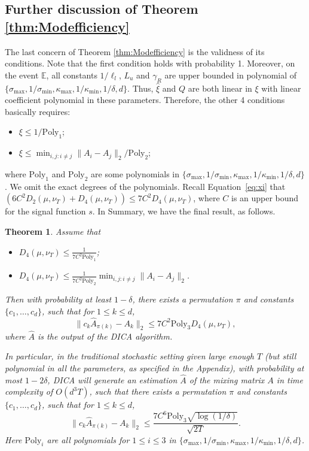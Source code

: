 \documentclass[twoside]{article}
\newcommand{\E}{\mathbb{E}}
\newtheorem{thm}[lemma]{Theorem}
\theoremstyle{definition}
\begin{document}
\subsection{Further discussion of Theorem \ref{thm:Modefficiency}}
 \label{subsec:ThminStocSetting}
The last concern of Theorem \ref{thm:Modefficiency} is the validness of its conditions. 
Note that the first condition holds with probability 1. 
Moreover, on the event $\E$, all constants $1/\ell_l$, $L_u$ and $\gamma_R$ are upper bounded in polynomial of $\{\sigma_{\max}, 1/\sigma_{\min}, \kappa_{\max}, 1/\kappa_{\min},1/\delta, d\}$. 
Thus, $\widehat{\xi}$  and $Q$ are both linear in $\xi$ with linear coefficient polynomial in these parameters.
Therefore, the other 4 conditions basically requires:
\begin{itemize}
\vspace{-3mm}
\item $\xi \le 1/ \text{Poly}_1$;
\item $\xi \le \min_{i,j:i\neq j} \|A_i - A_j\|_2 / \text{Poly}_2$;
\end{itemize} 
\vspace{-2mm}
where $\text{Poly}_1$ and $\text{Poly}_2$ are some polynomials in $\{\sigma_{\max}, 1/\sigma_{\min}, \kappa_{\max}, 1/\kappa_{\min},1/\delta, d\}$. 
We omit the exact degrees of the polynomials.
Recall Equation~\eqref{eq:xi} that $\left( 6C^2D_2(\mu, \nu_T) + D_4(\mu, \nu_T)\right) \le 7C^2D_4(\mu, \nu_T)$, where $C$ is an upper bound for the signal function $s$.
In Summary, we have the final result, as follows.
\begin{thm}
\label{thm:finalRes}
 Assume that 
\begin{itemize}
\vspace{-3mm}
\item $D_4(\mu, \nu_T) \le \frac{1}{7C^2\text{Poly}_1}$;
\item $D_4(\mu, \nu_T) \le \frac{1}{7C^2\text{Poly}_2}\min_{i,j:i\neq j} \|A_i - A_j\|_2$.
\end{itemize}
\vspace{-2mm}
Then with probability at least $1-\delta$, there exists a permutation $\pi$ and constants $\{c_1,\ldots,c_d\}$, such that for $1\le k\le d$,
\[
\| c_k\widehat{A}_{\pi(k)} - A_k\|_2 \le 7C^2\text{Poly}_3D_4(\mu, \nu_T),
\]
where $\widehat{A}$ is the output of the DICA algorithm.

In particular, in the traditional stochastic setting given large enough $T$ (but still polynomial in all the parameters, as specified in the Appendix),
 with probability at most $1-2\delta$, 
 DICA will generate an estimation $\widehat{A}$ of the mixing matrix $A$ in
 time complexity of $O(d^3T)$, 
 such that there exists a permutation $\pi$ and constants $\{c_1,\ldots,c_d\}$, such that for $1\le k\le d$,
\[
\| c_k\widehat{A}_{\pi(k)} - A_k\|_2 \le \frac{7C^6\text{Poly}_3\sqrt{\log(1/\delta)}}{\sqrt{2T}}.
\]
Here $\text{Poly}_i$ are all polynomials for $1\le i\le 3$ in $\{\sigma_{\max}, 1/\sigma_{\min}, \kappa_{\max}, 1/\kappa_{\min},1/\delta, d\}$.
\end{thm}
\end{document}
